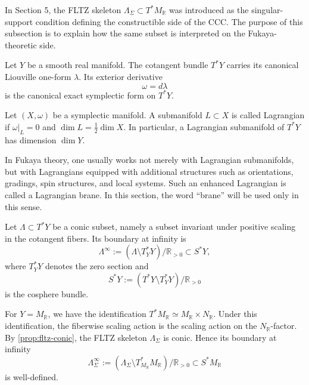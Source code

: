 In Section 5, the FLTZ skeleton
\(\Lambda_\Sigma\subset T^*M_{\mathbb R}\) was introduced as the
singular-support condition defining the constructible side of the CCC. The
purpose of this subsection is to explain how the same subset is interpreted
on the Fukaya-theoretic side.

\begin{definition}
Let \(Y\) be a smooth real manifold. The cotangent bundle \(T^*Y\) carries
its canonical Liouville one-form \(\lambda\). Its exterior derivative
\[
\omega=d\lambda
\]
is the canonical exact symplectic form on \(T^*Y\).
\end{definition}

\begin{definition}
Let \((X,\omega)\) be a symplectic manifold. A submanifold
\(L\subset X\) is called Lagrangian if \(\omega|_L=0\) and
\(\dim L=\frac{1}{2}\dim X\). In particular, a Lagrangian submanifold of
\(T^*Y\) has dimension \(\dim Y\).
\end{definition}

\begin{definition}
In Fukaya theory, one usually works not merely with Lagrangian
submanifolds, but with Lagrangians equipped with additional structures such
as orientations, gradings, spin structures, and local systems. Such an
enhanced Lagrangian is called a Lagrangian brane. In this section, the word
``brane'' will be used only in this sense.
\end{definition}

\begin{definition}
Let \(\Lambda\subset T^*Y\) be a conic subset, namely a subset invariant
under positive scaling in the cotangent fibers. Its boundary at infinity is
\[
\Lambda^\infty
:=
(\Lambda\setminus T_Y^*Y)/\mathbb R_{>0}
\subset S^*Y,
\]
where \(T_Y^*Y\) denotes the zero section and
\[
S^*Y:=(T^*Y\setminus T_Y^*Y)/\mathbb R_{>0}
\]
is the cosphere bundle.
\end{definition}

For \(Y=M_{\mathbb R}\), we have the identification
\(T^*M_{\mathbb R}\simeq M_{\mathbb R}\times N_{\mathbb R}\). Under this
identification, the fiberwise scaling action is the scaling action on the
\(N_{\mathbb R}\)-factor. By \cref{prop:fltz-conic}, the FLTZ skeleton
\(\Lambda_\Sigma\) is conic. Hence its boundary at infinity
\[
\Lambda_\Sigma^\infty
:=
(\Lambda_\Sigma\setminus T^*_{M_{\mathbb R}}M_{\mathbb R})/\mathbb R_{>0}
\subset S^*M_{\mathbb R}
\]
is well-defined.

